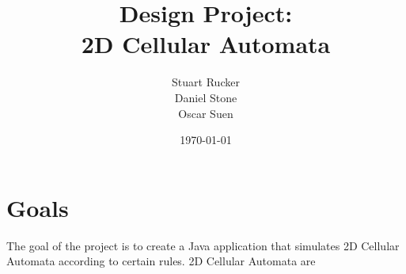 \documentclass[12pt]{article}
\title{Design Project: \\ 2D Cellular Automata}
\author{Stuart Rucker \\ Daniel Stone \\ Oscar Suen}
\date{\today}
\begin{document}
\maketitle

\section{Goals}
The goal of the project is to create a Java application that simulates 2D Cellular Automata according to certain rules.  2D Cellular Automata are 
\end{document}
